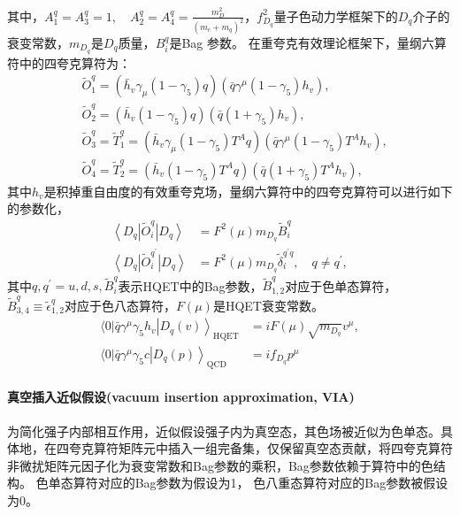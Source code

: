     其中，$A_1^q=A_3^q=1, \quad A_2^q=A_4^q=\frac{m_D^2}{\left(m_c+m_q\right)^2}$，$f^2_{D_{q}}$量子色动力学框架下的$D_{q}$介子的衰变常数，$m_{D_{q}}$是$D_{q}$质量，$B_{i}^{q}$是Bag 参数。
在重夸克有效理论框架下，量纲六算符中的四夸克算符为：
\begin{equation}
    \begin{aligned}
    & \tilde{O}_1^q=\left(\bar{h}_v \gamma_\mu\left(1-\gamma_5\right) q\right)\left(\bar{q} \gamma^\mu\left(1-\gamma_5\right) h_v\right), \\
    & \tilde{O}_2^q=\left(\bar{h}_v\left(1-\gamma_5\right) q\right)\left(\bar{q}\left(1+\gamma_5\right) h_v\right), \\
    & \tilde{O}_3^q=\tilde{T}_1^q=\left(\bar{h}_v \gamma_\mu\left(1-\gamma_5\right) T^A q\right)\left(\bar{q} \gamma^\mu\left(1-\gamma_5\right) T^A h_v\right), \\
    & \tilde{O}_4^q=\tilde{T}_2^q=\left(\bar{h}_v\left(1-\gamma_5\right) T^A q\right)\left(\bar{q}\left(1+\gamma_5\right) T^A h_v\right),
    \end{aligned}
    \end{equation}
其中$h_{v}$是积掉重自由度的有效重夸克场，量纲六算符中的四夸克算符可以进行如下的参数化，
\begin{equation}
    \begin{aligned}
    \left\langle D_q\right| \tilde{O}_i^q\left|D_q\right\rangle & =F^2(\mu) m_{D_q} \tilde{B}_i^q \\
    \left\langle D_q\right| \tilde{O}_i^{q^{\prime}}\left|D_q\right\rangle & =F^2(\mu) m_{D_q} \tilde{\delta}_i^{q^{\prime} q}, \quad q \neq q^{\prime},
    \end{aligned}
    \label{eq:dim6_4_parameters}
    \end{equation}
    其中$q, q^{\prime}=u, d, s, \tilde{B}_i^q$表示HQET中的Bag参数，$\tilde{B}_{1,2}^q$对应于色单态算符，$\tilde{B}_{3,4}^q \equiv \tilde{\epsilon}_{1,2}^q$对应于色八态算符，$F(\mu)$是HQET衰变常数。
    \begin{equation}
        \begin{aligned}
            \langle 0| \bar{q} \gamma^\mu \gamma_5 h_v\left|D_q(v)\right\rangle_{\mathrm{HQET}}&=i F(\mu) \sqrt{m_{D_q}} v^\mu,\\
            \langle 0| \bar{q} \gamma^\mu \gamma_5 c\left|D_q(p)\right\rangle_{\mathrm{QCD}}&=i f_{D_q} p^\mu
        \end{aligned}
        \end{equation}
    \paragraph{真空插入近似假设(vacuum insertion approximation, VIA)}为简化强子内部相互作用，近似假设强子内为真空态，其色场被近似为色单态。具体地，在四夸克算符矩阵元中插入一组完备集，仅保留真空态贡献，将四夸克算符非微扰矩阵元因子化为衰变常数和Bag参数的乘积，Bag参数依赖于算符中的色结构。
    色单态算符对应的Bag参数为假设为1， 色八重态算符对应的Bag参数被假设为0。

